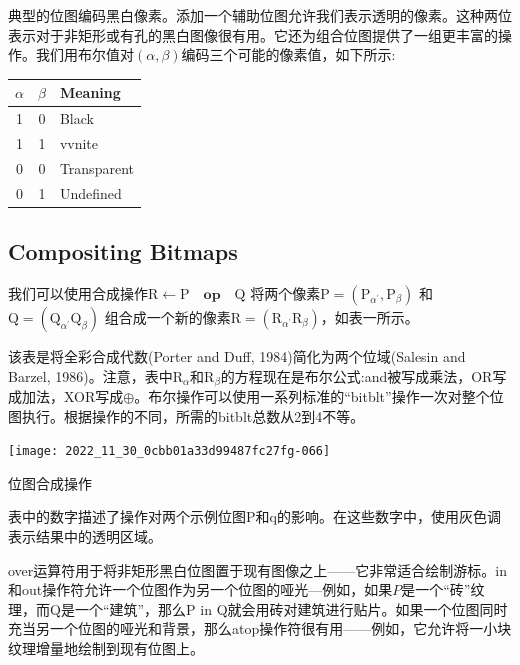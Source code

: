 \begin{CJK}{UTF8}{gbsn}
典型的位图编码黑白像素。添加一个辅助位图允许我们表示透明的像素。这种两位表示对于非矩形或有孔的黑白图像很有用。它还为组合位图提供了一组更丰富的操作。我们用布尔值对$(\alpha, \beta)$编码三个可能的像素值，如下所示:



\begin{center}
\begin{tabular}{ccl}
\hline
$\alpha$ & $\beta$ & Meaning \\
\hline
1 & 0 & Black \\
1 & 1 & vvnite \\
0 & 0 & Transparent \\
0 & 1 & Undefined \\
\hline
\end{tabular}
\end{center}


\subsection*{Compositing Bitmaps}

我们可以使用合成操作$\mathrm{R} \leftarrow \mathrm{P}\quad \mathbf{op} \quad \mathrm{Q}$
将两个像素$\mathrm{P}=\left(\mathrm{P}_{\alpha^{\prime}}, \mathrm{P}_{\beta}\right)$
和$\mathrm{Q}=\left(\mathrm{Q}_{\alpha^{\prime}} \mathrm{Q}_{\beta}\right)$
组合成一个新的像素$\mathrm{R}=\left(\mathrm{R}_{\alpha^{\prime}} \mathrm{R}_{\beta}\right)$，如表一所示。


该表是将全彩合成代数(Porter and Duff, 1984)简化为两个位域(Salesin and Barzel, 1986)。注意，表中$\mathrm{R}_{\alpha}$和$\mathrm{R}_{\beta}$的方程现在是布尔公式:and被写成乘法，OR写成加法，XOR写成$\oplus$。布尔操作可以使用一系列标准的“bitblt”操作一次对整个位图执行。根据操作的不同，所需的bitblt总数从2到4不等。



\begin{table}[htbp]
\begin{center}
\texttt{[image: 2022\_11\_30\_0cbb01a33d99487fc27fg-066]}
\end{center}
\caption{位图合成操作}
\end{table}

表中的数字描述了操作对两个示例位图$\mathrm{P}$和q的影响。在这些数字中，使用灰色调表示结果中的透明区域。


over运算符用于将非矩形黑白位图置于现有图像之上——它非常适合绘制游标。in和out操作符允许一个位图作为另一个位图的哑光—例如，如果$P$是一个“砖”纹理，而Q是一个“建筑”，那么P in Q就会用砖对建筑进行贴片。如果一个位图同时充当另一个位图的哑光和背景，那么atop操作符很有用——例如，它允许将一小块纹理增量地绘制到现有位图上。



\end{CJK}
